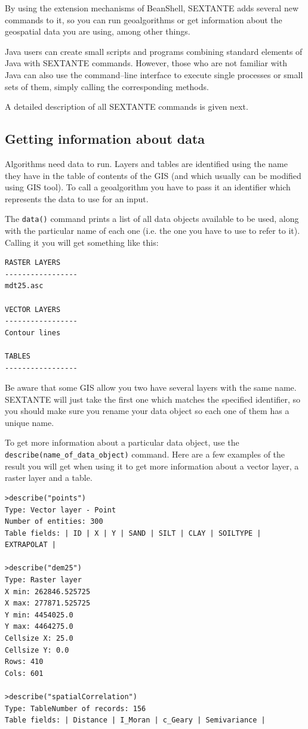 By using the extension mechanisms of BeanShell, SEXTANTE adds several new commands to it, so you can run geoalgorithms or get information about the geospatial data you are using, among other things.

Java users can create small scripts and programs combining standard elements of Java with SEXTANTE commands. However, those who are not familiar with Java can also use the command--line interface to execute single processes or small sets of them, simply calling the corresponding methods.

A detailed description of all SEXTANTE commands is given next.

\subsection{Getting information about data}

Algorithms need data to run. Layers and tables are identified using the name they have in the table of contents of the GIS (and which usually can be modified using GIS tool). To call a geoalgorithm you have to pass it an identifier which represents the data to use for an input.

The \texttt{data()} command prints a list of all data objects available to be used, along with the particular name of each one (i.e. the one you have to use to refer to it). Calling it you will get something like this:

\begin{verbatim}
RASTER LAYERS
-----------------
mdt25.asc

VECTOR LAYERS
-----------------
Contour lines

TABLES
-----------------
\end{verbatim}

Be aware that some GIS allow you two have several layers with the same name. SEXTANTE will just take the first one which matches the specified identifier, so you should make sure you rename your data object so each one of them has a unique name.

To get more information about a particular data object, use the \texttt{describe(name\_of\_data\_object)} command. Here are a few examples of the result you will get when using it to get more information about a vector layer, a raster layer and a table.

\begin{verbatim}
>describe("points")
Type: Vector layer - Point
Number of entities: 300
Table fields: | ID | X | Y | SAND | SILT | CLAY | SOILTYPE | EXTRAPOLAT |

>describe("dem25")
Type: Raster layer 
X min: 262846.525725
X max: 277871.525725
Y min: 4454025.0
Y max: 4464275.0
Cellsize X: 25.0
Cellsize Y: 0.0
Rows: 410
Cols: 601

>describe("spatialCorrelation")
Type: TableNumber of records: 156
Table fields: | Distance | I_Moran | c_Geary | Semivariance | 
\end{verbatim}


